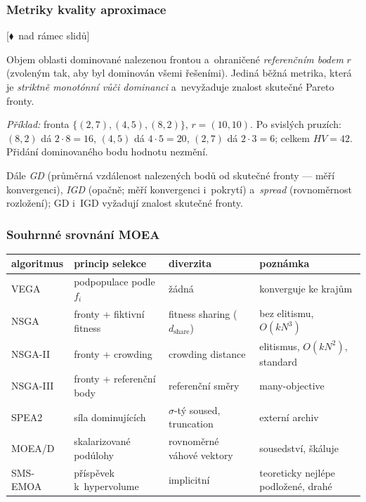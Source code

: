 \documentclass[11pt,a4paper]{article}
\theoremstyle{definition}
\newcommand{\mimo}{\textcolor{markcol}{\textsf{\footnotesize[$\blacklozenge$~nad rámec slidů]}}}
\begin{document}
\subsubsection{Metriky kvality aproximace}

\noindent\mimo{}

\begin{defbox}
Objem oblasti dominované nalezenou frontou a~ohraničené \emph{referenčním bodem} $r$
(zvoleným tak, aby byl dominován všemi řešeními). Jediná běžná metrika, která je
\emph{striktně monotónní vůči dominanci} a~nevyžaduje znalost skutečné Pareto fronty.

\emph{Příklad:} fronta $\{(2,7), (4,5), (8,2)\}$, $r = (10,10)$. Po svislých pruzích:
$(8,2)$ dá $2\cdot8 = 16$, $(4,5)$ dá $4\cdot5 = 20$, $(2,7)$ dá $2\cdot3 = 6$; celkem
$HV = 42$. Přidání dominovaného bodu hodnotu nezmění.
\end{defbox}

Dále \emph{GD} (průměrná vzdálenost nalezených bodů od skutečné fronty --- měří konvergenci),
\emph{IGD} (opačně; měří konvergenci i~pokrytí) a~\emph{spread} (rovnoměrnost rozložení);
GD i~IGD vyžadují znalost skutečné fronty.

\subsubsection{Souhrnné srovnání MOEA}

\begin{center}
\small
\begin{tabular}{@{}llll@{}}
\toprule
\textbf{algoritmus} & \textbf{princip selekce} & \textbf{diverzita} & \textbf{poznámka} \\
\midrule
VEGA & podpopulace podle $f_i$ & žádná & konverguje ke krajům \\
NSGA & fronty + fiktivní fitness & fitness sharing ($d_{\mathrm{share}}$) & bez elitismu, $O(kN^3)$ \\
NSGA-II & fronty + crowding & crowding distance & elitismus, $O(kN^2)$, standard \\
NSGA-III & fronty + referenční body & referenční směry & many-objective \\
SPEA2 & síla dominujících & $\sigma$-tý soused, truncation & externí archiv \\
MOEA/D & skalarizované podúlohy & rovnoměrné váhové vektory & sousedství, škáluje \\
SMS-EMOA & příspěvek k~hypervolume & implicitní & teoreticky nejlépe podložené, drahé \\
\bottomrule
\end{tabular}
\end{center}
\end{document}
